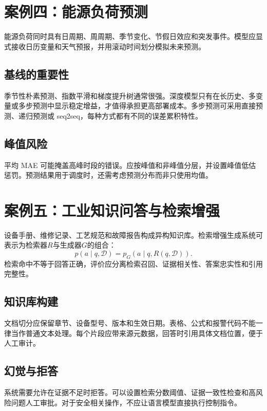\section{案例四：能源负荷预测}
能源负荷同时具有日周期、周周期、季节变化、节假日效应和突发事件。模型应显式接收日历变量和天气预报，并用滚动时间划分模拟未来预测。

\subsection{基线的重要性}
季节性朴素预测、指数平滑和梯度提升树通常很强。深度模型只有在长历史、多变量或多步预测中显示稳定增益，才值得承担更高部署成本。多步预测可采用直接预测、递归预测或 seq2seq，每种方式都有不同的误差累积特性。

\subsection{峰值风险}
平均 MAE 可能掩盖高峰时段的错误。应按峰值和非峰值分层，并设置峰值低估惩罚。预测结果用于调度时，还需考虑预测分布而非只使用均值。

\section{案例五：工业知识问答与检索增强}
设备手册、维修记录、工艺规范和故障报告构成异构知识库。检索增强生成系统可表示为检索器$R$与生成器$G$的组合：
\begin{equation}
 p(a\mid q,\mathcal{D})=p_G(a\mid q,R(q,\mathcal{D})).
\end{equation}
检索命中不等于回答正确，评价应分离检索召回、证据相关性、答案忠实性和引用完整性。

\subsection{知识库构建}
文档切分应保留章节、设备型号、版本和生效日期。表格、公式和报警代码不能一律当作普通文本处理。每个片段应带来源元数据，回答时引用具体文档位置，便于人工审计。

\subsection{幻觉与拒答}
系统需要允许在证据不足时拒答。可以设置检索分数阈值、证据一致性检查和高风险问题人工审批。对于安全相关操作，不应让语言模型直接执行控制指令。

